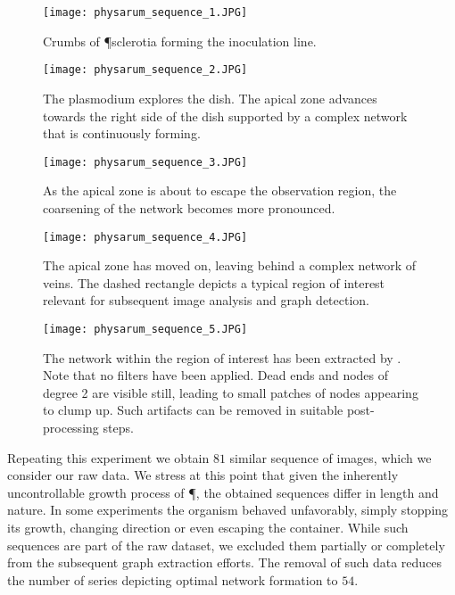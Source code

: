 	\begin{figure}
		\centering
		\texttt{[image: physarum\_sequence\_1.JPG]}
		\caption[Crumbs of \P sclerotia forming an inoculation line]{Crumbs of \P sclerotia forming the inoculation line.}
		\label{fig:sequence_1}
	\end{figure}

	\begin{figure}
		\centering
		\texttt{[image: physarum\_sequence\_2.JPG]}
		\caption[The apical zone advances]{The plasmodium explores the dish. The apical zone advances towards the right side of the dish supported by a complex network that is continuously forming.}
		\label{fig:sequence_2}
	\end{figure}

	\begin{figure}
		\centering
		\texttt{[image: physarum\_sequence\_3.JPG]}
		\caption[The onset of network coarsening]{As the apical zone is about to escape the observation region, the coarsening of the network becomes more pronounced.}
		\label{fig:sequence_3}
	\end{figure}

	\begin{figure}
		\centering
		\texttt{[image: physarum\_sequence\_4.JPG]}
		\caption[A complex network of veins within a region of interest]{The apical zone has moved on, leaving behind a complex network of veins. The dashed rectangle depicts a typical region of interest relevant for subsequent image analysis and graph detection.}
		\label{fig:sequence_4}
	\end{figure}

	\begin{figure}
		\centering
		\texttt{[image: physarum\_sequence\_5.JPG]}
		\caption[Graph extracted from a sample region of interest]{The network within the region of interest has been extracted by \NEFI. Note that no filters have been applied. Dead ends and nodes of degree 2 are visible still, leading to small patches of nodes appearing to clump up. Such artifacts can be removed in suitable post-processing steps.}
		\label{fig:sequence_5}
	\end{figure}

	Repeating this experiment we obtain $81$ similar sequence of images, which we consider our raw data. We stress at this point that given the inherently uncontrollable growth process of \P, the obtained sequences differ in length and nature. In some experiments the organism behaved unfavorably, simply stopping its growth, changing direction or even escaping the container. While such sequences are part of the raw dataset, we excluded them partially or completely from the subsequent graph extraction efforts. The removal of such data reduces the number of series depicting optimal network formation to $54$.

